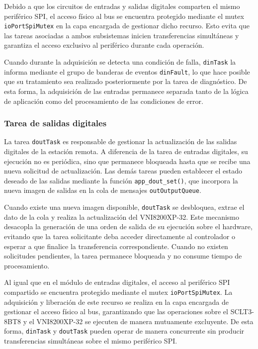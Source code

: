 Debido a que los circuitos de entradas y salidas digitales comparten el mismo periférico SPI, el acceso físico al bus se encuentra protegido mediante el mutex \texttt{ioPortSpiMutex} en la capa encargada de gestionar dicho recurso. Esto evita que las tareas asociadas a ambos subsistemas inicien transferencias simultáneas y garantiza el acceso exclusivo al periférico durante cada operación.

Cuando durante la adquisición se detecta una condición de falla, \texttt{dinTask} la informa mediante el grupo de banderas de eventos \texttt{dinFault}, lo que hace posible que su tratamiento sea realizado posteriormente por la tarea de diagnóstico. De esta forma, la adquisición de las entradas permanece separada tanto de la lógica de aplicación como del procesamiento de las condiciones de error.

\subsubsection{Tarea de salidas digitales}

La tarea \texttt{doutTask} es responsable de gestionar la actualización de las salidas digitales de la estación remota. A diferencia de la tarea de entradas digitales, su ejecución no es periódica, sino que permanece bloqueada hasta que se recibe una nueva solicitud de actualización. Las demás tareas pueden establecer el estado deseado de las salidas mediante la función \texttt{app\_dout\_set()}, que incorpora la nueva imagen de salidas en la cola de mensajes \texttt{outOutputQueue}.

Cuando existe una nueva imagen disponible, \texttt{doutTask} se desbloquea, extrae el dato de la cola y realiza la actualización del VNI8200XP-32. Este mecanismo desacopla la generación de una orden de salida de su ejecución sobre el hardware, evitando que la tarea solicitante deba acceder directamente al controlador o esperar a que finalice la transferencia correspondiente. Cuando no existen solicitudes pendientes, la tarea permanece bloqueada y no consume tiempo de procesamiento.

Al igual que en el módulo de entradas digitales, el acceso al periférico SPI compartido se encuentra protegido mediante el mutex \texttt{ioPortSpiMutex}. La adquisición y liberación de este recurso se realiza en la capa encargada de gestionar el acceso físico al bus, garantizando que las operaciones sobre el SCLT3-8BT8 y el VNI8200XP-32 se ejecuten de manera mutuamente excluyente. De esta forma, \texttt{dinTask} y \texttt{doutTask} pueden operar de manera concurrente sin producir transferencias simultáneas sobre el mismo periférico SPI.


